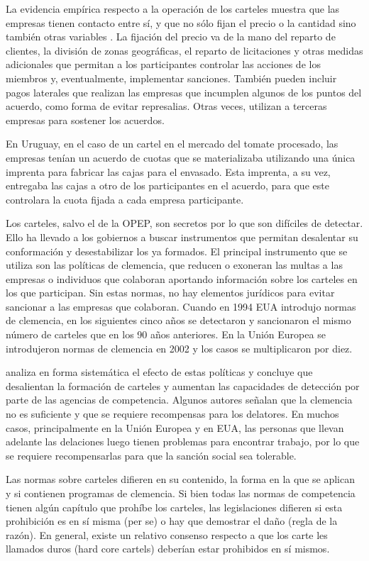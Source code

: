 \documentclass[
  12pt,
  spanish,
]{book}
\begin{document}
La evidencia empírica respecto a la operación de los carteles muestra que las empresas tienen contacto entre sí, y que no sólo fijan el precio o la cantidad sino también otras variables \citep{Levenstein2006}. La fijación del precio va de la mano del reparto de clientes, la división de zonas geográficas, el reparto de licitaciones y otras medidas adicionales que permitan a los participantes controlar las acciones de los miembros y, eventualmente, implementar sanciones. También pueden incluir pagos laterales que realizan las empresas que incumplen algunos de los puntos del acuerdo, como forma de evitar represalias. Otras veces, utilizan a terceras empresas para sostener los acuerdos.

En Uruguay, en el caso de un cartel en el mercado del tomate procesado, las empresas tenían un acuerdo de cuotas que se materializaba utilizando una única imprenta para fabricar las cajas para el envasado. Esta imprenta, a su vez, entregaba las cajas a otro de los participantes en el acuerdo, para que este controlara la cuota fijada a cada empresa participante.

Los carteles, salvo el de la OPEP, son secretos por lo que son difíciles de detectar. Ello ha llevado a los gobiernos a buscar instrumentos que permitan desalentar su conformación y desestabilizar los ya formados. El principal instrumento que se utiliza son las políticas de clemencia, que reducen o exoneran las multas a las empresas o individuos que colaboran aportando información sobre los carteles en los que participan. Sin estas normas, no hay elementos jurídicos para evitar sancionar a las empresas que colaboran. Cuando en 1994 EUA introdujo
normas de clemencia, en los siguientes cinco años se detectaron y sancionaron el mismo número de carteles que en los 90 años anteriores. En la Unión Europea se introdujeron normas de clemencia en 2002 y los casos se multiplicaron por diez.

\citet{Miller2009} analiza en forma sistemática el efecto de estas políticas y concluye que desalientan la formación de carteles y aumentan las capacidades de detección por parte de las agencias de competencia. Algunos autores señalan que la clemencia no es suficiente y que se requiere recompensas para los delatores. En muchos casos, principalmente en la Unión Europea y en EUA, las personas que llevan adelante las delaciones luego tienen problemas para encontrar trabajo, por lo que se requiere recompensarlas para que la sanción social sea tolerable.

Las normas sobre carteles difieren en su contenido, la forma en la que se aplican y si contienen programas de clemencia. Si bien todas las normas de competencia tienen algún capítulo que prohíbe los carteles, las legislaciones difieren si esta prohibición es en sí misma (per se) o hay que demostrar el daño (regla de la razón). En general, existe un relativo consenso respecto a que los carte les llamados duros (hard core cartels) deberían estar prohibidos en sí mismos.
\end{document}
